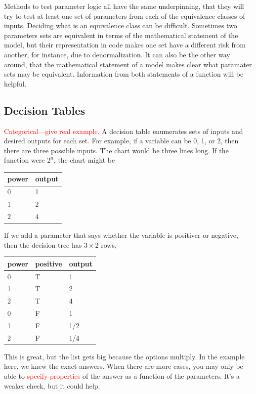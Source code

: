 \documentclass[fleqn,10pt]{olplainarticle}
\newcommand{\aside}[1]{\textcolor{red}{#1}}
\begin{document}
Methods to test parameter logic all have the same underpinning,
that they will try to test at least one set of parameters from
each of the equivalence classes of inputs. Deciding what is an
equivalence class can be difficult. Sometimes two parameters
sets are equivalent in terms of the mathematical statement of 
the model, but their representation in code makes one set
have a different risk from another, for instance, due to
denormalization. It can also be the other way around, that
the mathematical statement of a model makes clear what paramater
sets may be equivalent. Information from both statements of
a function will be helpful.


\subsection{Decision Tables}
\aside{Categorical---give real example.}
A decision table enumerates sets of inputs and desired outputs for each set.
For example, if a variable can be 0, 1, or 2, then there are three possible
inputs. The chart would be three lines long. If the function were $2^n$,
the chart might be

\begin{center}
\begin{tabular}{|l|l|}\hline
power & output \\ \hline
0 & 1 \\
1 & 2 \\
2 & 4 \\ \hline
\end{tabular}
\end{center}

If we add a parameter that says whether the variable is positiver or negative,
then the decision tree has $3\times 2$ rows,

\begin{center}
\begin{tabular}{|l|l|l|}\hline
power & positive &output \\ \hline
0 & T & 1 \\
1 & T & 2 \\
2 & T & 4 \\
0 & F & 1 \\
1 & F & 1/2 \\
2 & F & 1/4 \\ \hline
\end{tabular}
\end{center}

This is great, but the list gets big because the options multiply.
In the example here, we knew the exact answers.
When there are more cases, you may only be able to \aside{specify properties} of the
answer as a function of the parameters. It's a weaker check,
but it could help.
\end{document}
